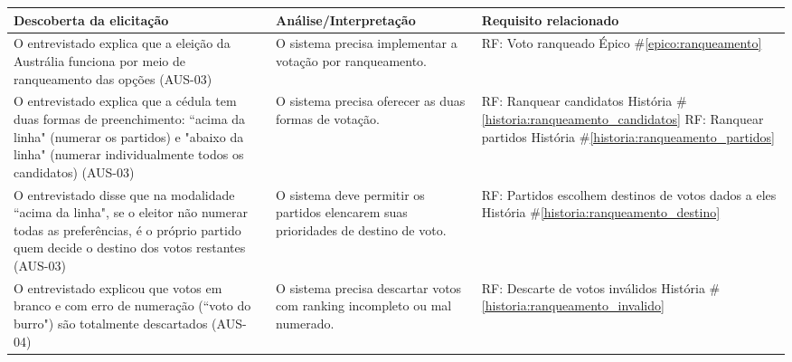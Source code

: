 \documentclass[12pt,a4paper]{article}
\newcounter{epico}
\newcounter{historia}
\begin{document}
\begin{longtable}{|p{7cm}|p{4.5cm}|p{4.5cm}|}
    \hline
    \rowcolor[gray]{0.9}
    \textbf{Descoberta da elicitação} &
    \textbf{Análise/Interpretação} &
    \textbf{Requisito relacionado} \\
    \hline

    O entrevistado explica que a eleição da Austrália funciona por meio de ranqueamento das opções (AUS-03)
    & O sistema precisa implementar a votação por ranqueamento.
    & RF: Voto ranqueado
    \newline \newline Épico \#\ref{epico:ranqueamento} \\
    
    \hline
    
    O entrevistado explica que a cédula tem duas formas de preenchimento: ``acima da linha" (numerar os partidos) e "abaixo da linha" (numerar individualmente todos os candidatos) (AUS-03)
    & O sistema precisa oferecer as duas formas de votação.
    & RF: Ranquear candidatos
    \newline \newline História \#\ref{historia:ranqueamento_candidatos}
    \newline \newline
    RF: Ranquear partidos
    \newline \newline História \#\ref{historia:ranqueamento_partidos} \\
    
    \hline
    
    O entrevistado disse que na modalidade ``acima da linha", se o eleitor não numerar todas as preferências, é o próprio partido quem decide o destino dos votos restantes (AUS-03)
    & O sistema deve permitir os partidos elencarem suas prioridades de destino de voto.
    & RF: Partidos escolhem destinos de votos dados a eles
    \newline \newline História \#\ref{historia:ranqueamento_destino} \\
    
    \hline
    
    O entrevistado explicou que votos em branco e com erro de numeração (``voto do burro") são totalmente descartados (AUS-04)
    & O sistema precisa descartar votos com ranking incompleto ou mal numerado.
    & RF: Descarte de votos inválidos
    \newline \newline História \#\ref{historia:ranqueamento_invalido} \\
    

\end{longtable}
\end{document}
